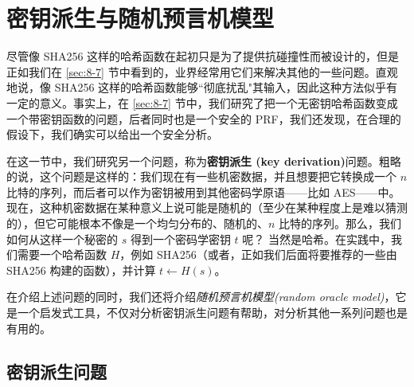 \section{密钥派生与随机预言机模型}\label{sec:8-10}

尽管像 SHA256 这样的哈希函数在起初只是为了提供抗碰撞性而被设计的，但是正如我们在 \ref{sec:8-7} 节中看到的，业界经常用它们来解决其他的一些问题。直观地说，像 SHA256 这样的哈希函数能够``彻底扰乱"其输入，因此这种方法似乎有一定的意义。事实上，在 \ref{sec:8-7} 节中，我们研究了把一个无密钥哈希函数变成一个带密钥函数的问题，后者同时也是一个安全的 PRF，我们还发现，在合理的假设下，我们确实可以给出一个安全分析。

在这一节中，我们研究另一个问题，称为\textbf{密钥派生 (key derivation)}问题。粗略的说，这个问题是这样的：我们现在有一些机密数据，并且想要把它转换成一个 $n$ 比特的序列，而后者可以作为密钥被用到其他密码学原语——比如 AES——中。现在，这种机密数据在某种意义上说可能是随机的（至少在某种程度上是难以猜测的），但它可能根本不像是一个均匀分布的、随机的、$n$ 比特的序列。那么，我们如何从这样一个秘密的 $s$ 得到一个密码学密钥 $t$ 呢？ 当然是哈希。在实践中，我们需要一个哈希函数 $H$，例如 SHA256（或者，正如我们后面将要推荐的一些由 SHA256 构建的函数），并计算 $t\leftarrow H(s)$。

在介绍上述问题的同时，我们还将介绍\emph{随机预言机模型(random oracle model)}，它是一个启发式工具，不仅对分析密钥派生问题有帮助，对分析其他一系列问题也是有用的。

\subsection{密钥派生问题}\label{subsec:8-10-1}

